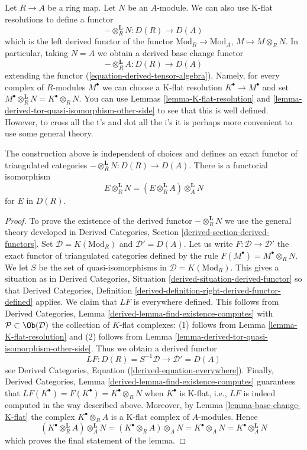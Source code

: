 \noindent
Let $R \to A$ be a ring map. Let $N$ be an $A$-module. We can also use K-flat
resolutions to define a functor
$$
- \otimes_R^{\mathbf{L}} N : D(R) \to D(A)
$$
which is the left derived functor of the functor
$\text{Mod}_R \to \text{Mod}_A$, $M \mapsto M \otimes_R N$.
In particular, taking $N = A$ we obtain a derived base change functor
$$
- \otimes_R^{\mathbf{L}} A : D(R) \to D(A)
$$
extending the functor (\ref{equation-derived-tensor-algebra}).
Namely, for every complex of $R$-modules $M^\bullet$ we can
choose a K-flat resolution $K^\bullet \to M^\bullet$ and set
$M^\bullet \otimes_R^{\mathbf{L}} N = K^\bullet \otimes_R N$.
You can use
Lemmas \ref{lemma-K-flat-resolution} and
\ref{lemma-derived-tor-quasi-isomorphism-other-side}
to see that this is well defined. However, to cross all the t's and dot all
the i's it is perhaps more convenient to use some general theory.

\begin{lemma}
\label{lemma-derived-base-change}
The construction above is independent of choices and defines an exact
functor of triangulated categories $- \otimes_R^\mathbf{L} N : D(R) \to D(A)$.
There is a functorial isomorphism
$$
E \otimes_R^\mathbf{L} N = (E \otimes_R^\mathbf{L} A) \otimes_A^\mathbf{L} N
$$
for $E$ in $D(R)$.
\end{lemma}

\begin{proof}
To prove the existence of the derived functor $- \otimes_R^\mathbf{L} N$
we use the general theory developed in
Derived Categories, Section \ref{derived-section-derived-functors}.
Set $\mathcal{D} = K(\text{Mod}_R)$ and $\mathcal{D}' = D(A)$.
Let us write $F : \mathcal{D} \to \mathcal{D}'$ the exact functor
of triangulated categories defined by the rule
$F(M^\bullet) = M^\bullet \otimes_R N$. We let $S$ be the set of
quasi-isomorphisms in $\mathcal{D} = K(\text{Mod}_R)$.
This gives a situation as in
Derived Categories, Situation \ref{derived-situation-derived-functor}
so that
Derived Categories, Definition
\ref{derived-definition-right-derived-functor-defined}
applies. We claim that $LF$ is everywhere defined.
This follows from
Derived Categories, Lemma \ref{derived-lemma-find-existence-computes}
with $\mathcal{P} \subset \Ob(\mathcal{D})$ the collection
of $K$-flat complexes: (1) follows from
Lemma \ref{lemma-K-flat-resolution}
and (2) follows from
Lemma \ref{lemma-derived-tor-quasi-isomorphism-other-side}.
Thus we obtain a derived functor
$$
LF : D(R) = S^{-1}\mathcal{D} \longrightarrow \mathcal{D}' = D(A)
$$
see
Derived Categories, Equation (\ref{derived-equation-everywhere}).
Finally,
Derived Categories, Lemma \ref{derived-lemma-find-existence-computes}
guarantees that $LF(K^\bullet) = F(K^\bullet) = K^\bullet \otimes_R N$
when $K^\bullet$ is K-flat, i.e., $LF$ is indeed computed in the way
described above. Moreover, by Lemma \ref{lemma-base-change-K-flat}
the complex $K^\bullet \otimes_R A$ is a K-flat complex of $A$-modules.
Hence
$$
(K^\bullet \otimes_R^\mathbf{L} A) \otimes_A^\mathbf{L} N =
(K^\bullet \otimes_R A) \otimes_A N =
K^\bullet \otimes_A N =
K^\bullet \otimes_A^\mathbf{L} N
$$
which proves the final statement of the lemma.
\end{proof}

